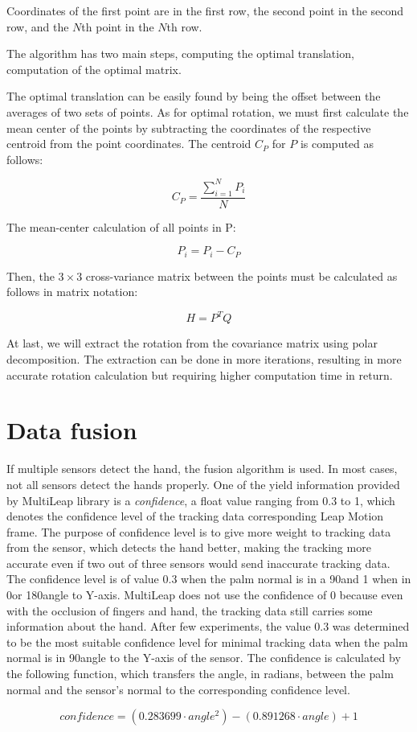 Coordinates of the first point are in the first row, the second point in the second row, and the $N$th point in the $N$th row.

The algorithm has two main steps, computing the optimal translation, computation of the optimal matrix.

The optimal translation can be easily found by being the offset between the averages of two sets of points. As for optimal rotation, we must first calculate the mean center of the points by subtracting the coordinates of the respective centroid from the point coordinates. The centroid $C_P$ for $P$ is computed as follows:

\begin{equation}
    {C_P = {\frac{\sum_{i=1}^{N}P_i}{N}}}
\end{equation}

The mean-center calculation of all points in P:

\begin{equation}
    {P_i = P_i - C_P}
\end{equation}

Then, the $3\times3$ cross-variance matrix between the points must be calculated as follows in matrix notation:

\begin{equation}
    {H = P^T Q}
\end{equation}

At last, we will extract the rotation from the covariance matrix using polar decomposition. The extraction can be done in more iterations, resulting in more accurate rotation calculation but requiring higher computation time in return.

\section{Data fusion}

If multiple sensors detect the hand, the fusion algorithm is used. In most cases, not all sensors detect the hands properly. One of the yield information provided by MultiLeap library is a \textit{confidence}, a float value ranging from 0.3 to 1, which denotes the confidence level of the tracking data corresponding Leap Motion frame. The purpose of confidence level is to give more weight to tracking data from the sensor, which detects the hand better, making the tracking more accurate even if two out of three sensors would send inaccurate tracking data. The confidence level is of value 0.3 when the palm normal is in a 90\textdegree and 1 when in 0\textdegree or 180\textdegree angle to Y-axis. MultiLeap does not use the confidence of 0 because even with the occlusion of fingers and hand, the tracking data still carries some information about the hand. After few experiments, the value 0.3 was determined to be the most suitable confidence level for minimal tracking data when the palm normal is in 90\textdegree angle to the Y-axis of the sensor. The confidence is calculated by the following function, which transfers the angle, in radians, between the palm normal and the sensor's normal to the corresponding confidence level.

\begin{equation}
    {confidence = (0.283699 \cdot angle^2)-(0.891268 \cdot angle)+1}
\end{equation}

